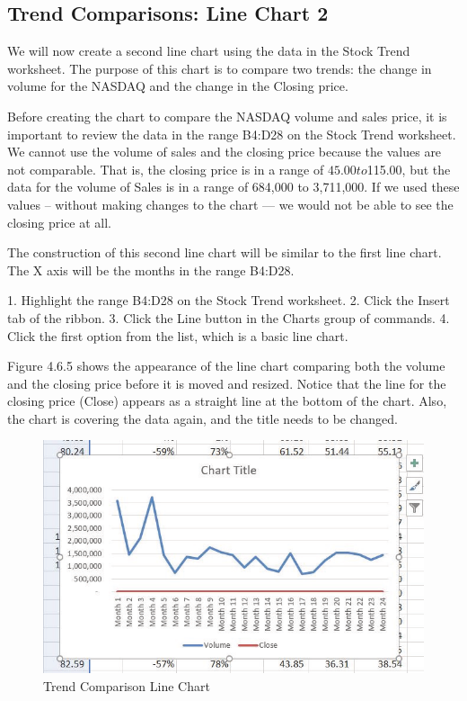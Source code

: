 \subsection{Trend Comparisons: Line Chart 2}

We will now create a second line chart using the data in the Stock Trend worksheet. The purpose of
this chart is to compare two trends: the change in volume for the NASDAQ and the change in the
Closing price.

Before creating the chart to compare the NASDAQ volume and sales price, it is important to review
the data in the range B4:D28 on the Stock Trend worksheet. We cannot use the volume of sales and the
closing price because the values are not comparable. That is, the closing price is in a range of $45.00
to $115.00, but the data for the volume of Sales is in a range of 684,000 to 3,711,000. If we used these
values – without making changes to the chart — we would not be able to see the closing price at all.


The construction of this second line chart will be similar to the first line chart. The X axis will be the
months in the range B4:D28.

1.   Highlight the range B4:D28 on the Stock Trend worksheet.
2.   Click the Insert tab of the ribbon.
3.   Click the Line button in the Charts group of commands.
4.   Click the first option from the list, which is a basic line chart.

Figure 4.6.5 shows the appearance of the line chart comparing both the volume and the closing price
before it is moved and resized. Notice that the line for the closing price (Close) appears as a straight
line at the bottom of the chart. Also, the chart is covering the data again, and the title needs to be
changed.


\begin{figure}[H]
	\centering
	\includegraphics[width=\maxwidth{.95\linewidth}]{gfx/ch04_fig07}
	\caption{Trend Comparison Line Chart}
	\label{04:fig07}
\end{figure}





